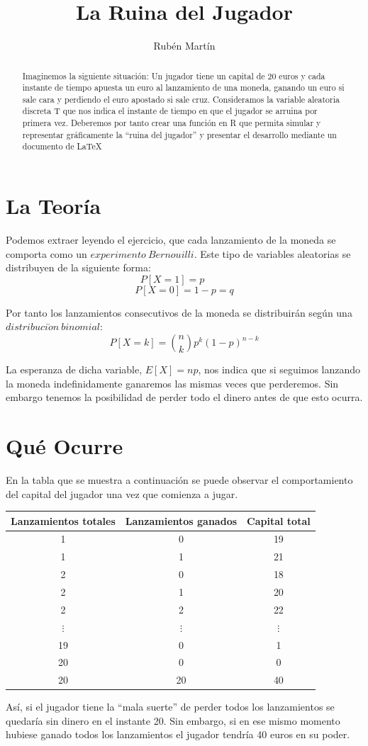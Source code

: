\documentclass[10pt,a4paper]{article}
\author{Rubén Martín}
\title{La Ruina del Jugador}
\date{}
\begin{document}
\maketitle

\begin{abstract}
Imaginemos la siguiente situación: Un jugador tiene un capital de 20 euros y cada instante de tiempo apuesta un euro al lanzamiento de una moneda, ganando un euro si sale cara y perdiendo el euro apostado si sale cruz. Consideramos la variable aleatoria discreta T que nos indica el instante de tiempo en que el jugador se arruina por primera vez. Deberemos por tanto crear una función en R que permita simular y representar gráficamente la ``ruina del jugador'' y presentar el desarrollo mediante un documento de LaTeX\cite{LaTeX}
\end{abstract}

\tableofcontents

\newpage
\section{La Teoría}
Podemos extraer leyendo el ejercicio, que cada lanzamiento de la moneda se comporta como un $experimento\ Bernouilli$. Este tipo de variables aleatorias\cite{prob} se distribuyen de la siguiente forma:
$$P[X=1]=p\ \ \ \ \ \ \ \ \ \ \ $$
$$P[X=0]=1-p=q$$

Por tanto los lanzamientos consecutivos de la moneda se distribuirán según una $distribuci\acute{o}n\ binomial$:
$$P[X=k]=\binom{n}{k} p^k(1-p)^{n-k}$$

La esperanza de dicha variable, $E[X]=np$, nos indica que si seguimos lanzando la moneda indefinidamente ganaremos  las mismas veces que perderemos. Sin embargo tenemos la posibilidad de perder todo el dinero antes de que esto ocurra.
\newpage
\section{Qué Ocurre}
En la tabla que se muestra a continuación se puede observar el comportamiento del capital del jugador una vez que comienza a jugar.

\begin{center}
\begin{tabular}[t]{c c c}
Lanzamientos totales & Lanzamientos ganados & Capital total\\
\hline
1 & 0 & 19\\
1 & 1 & 21\\
2 & 0 & 18\\
2 & 1 & 20\\
2 & 2 & 22\\
$\vdots$ & $\vdots$ & $\vdots$\\
19 & 0 & 1\\
20 & 0 & 0\\
20 & 20 & 40\\
\end{tabular}
\end{center}
Así, si el jugador tiene la ``mala suerte'' de perder todos los lanzamientos se quedaría sin dinero en el instante 20. Sin embargo, si en ese mismo momento hubiese ganado todos los lanzamientos el jugador tendría 40 euros en su poder.
\newpage
\end{document}

